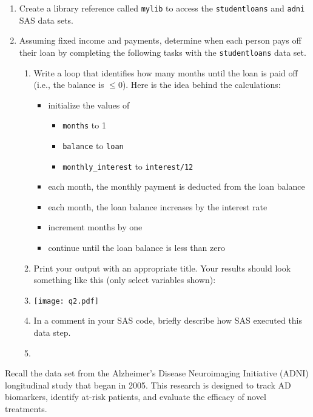\begin{enumerate}
\item Create a library reference called \texttt{mylib} to access the \texttt{studentloans} and \texttt{adni} SAS data sets.
\item Assuming fixed income and payments, determine when each person pays off their loan by completing the following tasks with the \texttt{studentloans} data set.
        \begin{enumerate}
        \item Write a loop that identifies how many months until the loan is paid off (i.e., the balance is $\leq 0$).  Here is the idea behind the calculations:
        \begin{itemize}
            \item initialize the values of 
            \begin{itemize} 
            \item \texttt{months} to 1
            \item \texttt{balance} to \texttt{loan} 
            \item \texttt{monthly\_interest} to \texttt{interest/12}
            \end{itemize}
            \item each month, the monthly payment is deducted from the loan balance
            \item each month, the loan balance increases by the interest rate
            \item increment months by one
            \item continue until the loan balance is less than zero
        \end{itemize}
        \item Print your output with an appropriate title.  Your results should look something like this (only select variables shown):
        \item[] \texttt{[image: q2.pdf]}
        \item In a comment in your SAS code, briefly describe how SAS executed this data step.
        \item[]
        \end{enumerate}
\end{enumerate}
Recall the  data set from the Alzheimer's Disease Neuroimaging Initiative (ADNI) longitudinal study that began in 2005.  This research is designed to track AD biomarkers, identify at-risk patients, and evaluate the efficacy of novel treatments. 
